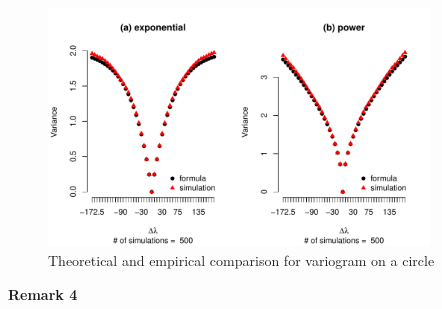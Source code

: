 \begin{figure}[H]
	\centering
	\includegraphics[width=0.9\textwidth]{graphs/variogram_plot_500}
	\caption {Theoretical and empirical comparison for variogram on a circle}
\end{figure}

{\bf Remark 4} 

